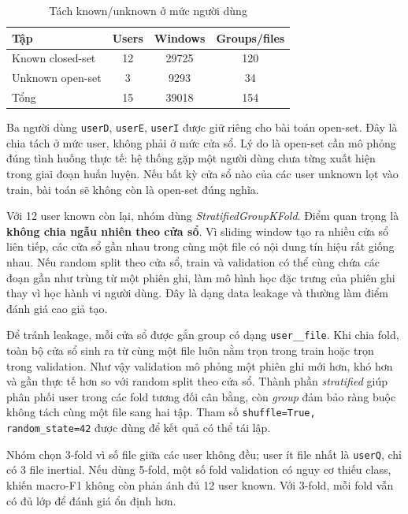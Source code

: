\documentclass[12pt,a4paper]{article}
\begin{document}
\begin{table}[H]
    \centering
    \caption{Tách known/unknown ở mức người dùng}
    \label{tab:known-unknown}
    \begin{tabular}{lccc}
        \toprule
        Tập & Users & Windows & Groups/files \\
        \midrule
        Known closed-set & 12 & 29725 & 120 \\
        Unknown open-set & 3 & 9293 & 34 \\
        \midrule
        Tổng & 15 & 39018 & 154 \\
        \bottomrule
    \end{tabular}
\end{table}

Ba người dùng \texttt{userD}, \texttt{userE}, \texttt{userI} được giữ riêng cho bài toán open-set. Đây là chia tách ở mức user, không phải ở mức cửa sổ. Lý do là open-set cần mô phỏng đúng tình huống thực tế: hệ thống gặp một người dùng chưa từng xuất hiện trong giai đoạn huấn luyện. Nếu bất kỳ cửa sổ nào của các user unknown lọt vào train, bài toán sẽ không còn là open-set đúng nghĩa.

Với 12 user known còn lại, nhóm dùng \textit{StratifiedGroupKFold}. Điểm quan trọng là \textbf{không chia ngẫu nhiên theo cửa sổ}. Vì sliding window tạo ra nhiều cửa sổ liên tiếp, các cửa sổ gần nhau trong cùng một file có nội dung tín hiệu rất giống nhau. Nếu random split theo cửa sổ, train và validation có thể cùng chứa các đoạn gần như trùng từ một phiên ghi, làm mô hình học đặc trưng của phiên ghi thay vì học hành vi người dùng. Đây là dạng data leakage và thường làm điểm đánh giá cao giả tạo.

Để tránh leakage, mỗi cửa sổ được gắn group có dạng \texttt{user\_\_file}. Khi chia fold, toàn bộ cửa sổ sinh ra từ cùng một file luôn nằm trọn trong train hoặc trọn trong validation. Như vậy validation mô phỏng một phiên ghi mới hơn, khó hơn và gần thực tế hơn so với random split theo cửa sổ. Thành phần \textit{stratified} giúp phân phối user trong các fold tương đối cân bằng, còn \textit{group} đảm bảo ràng buộc không tách cùng một file sang hai tập. Tham số \texttt{shuffle=True, random\_state=42} được dùng để kết quả có thể tái lập.

Nhóm chọn 3-fold vì số file giữa các user không đều; user ít file nhất là \texttt{userQ}, chỉ có 3 file inertial. Nếu dùng 5-fold, một số fold validation có nguy cơ thiếu class, khiến macro-F1 không còn phản ánh đủ 12 user known. Với 3-fold, mỗi fold vẫn có đủ lớp để đánh giá ổn định hơn.
\end{document}
